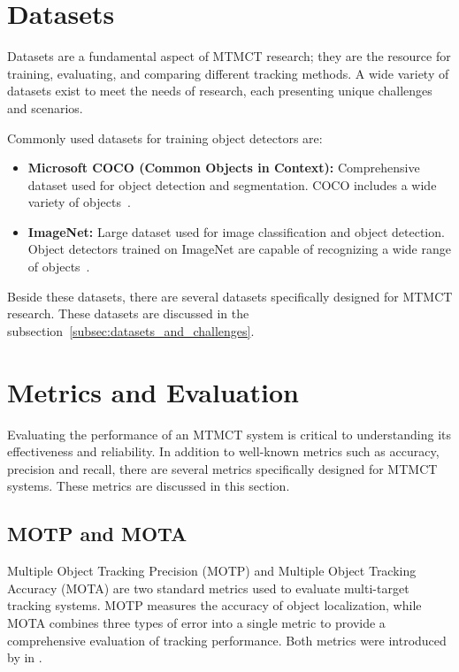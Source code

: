 \section{Datasets}\label{sec:datasets}
Datasets are a fundamental aspect of MTMCT research; they are the resource for training, evaluating, and comparing different tracking methods. A wide variety of datasets exist to meet the needs of research, each presenting unique challenges and scenarios.

Commonly used datasets for training object detectors are:

\begin{itemize}
    \item \textbf{Microsoft COCO (Common Objects in Context):} Comprehensive dataset used for object detection and segmentation. COCO includes a wide variety of objects~\cite{Lin14}.
    \item \textbf{ImageNet:} Large dataset used for image classification and object detection. Object detectors trained on ImageNet are capable of recognizing a wide range of objects~\cite{Deng09}.
\end{itemize}

Beside these datasets, there are several datasets specifically designed for MTMCT research. These datasets are discussed in the subsection~\ref{subsec:datasets_and_challenges}.

\section{Metrics and Evaluation}\label{sec:metrics_and_evaluation}
Evaluating the performance of an MTMCT system is critical to understanding its effectiveness and reliability. In addition to well-known metrics such as accuracy, precision and recall, there are several metrics specifically designed for MTMCT systems. These metrics are discussed in this section.

\subsection{MOTP and MOTA}\label{subsec:motp_mota}
Multiple Object Tracking Precision (MOTP) and Multiple Object Tracking Accuracy (MOTA) are two standard metrics used to evaluate multi-target tracking systems. MOTP measures the accuracy of object localization, while MOTA combines three types of error into a single metric to provide a comprehensive evaluation of tracking performance. Both metrics were introduced by \textcite{Bernardin08} in \citeyear{Bernardin08}.

